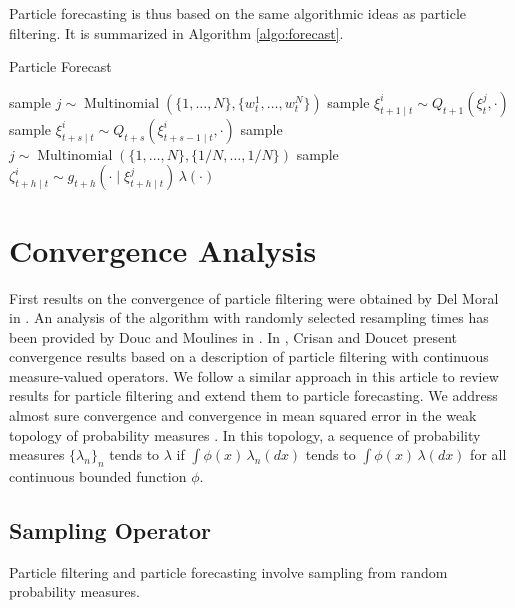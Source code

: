 \documentclass{article}
\begin{document}
Particle forecasting is thus based on the same algorithmic ideas as particle filtering. It is summarized in Algorithm \ref{algo:forecast}.

\begin{algorithm}
\caption{Particle Forecast}
\label{algo:forecast}
\begin{algorithmic}
      \State sample $j \sim \operatorname{Multinomial}(\{1,\dots,N\}, \{w^1_t,\dots,w^N_t\})$
      \State sample $\xi^i_{t+1 \mid t} \sim Q_{t+1}(\xi^j_t,\cdot)$
      \State sample $\xi^i_{t+s \mid t} \sim Q_{t+s}(\xi^i_{t+s-1 \mid t},\cdot)$
    \EndFor
  \EndFor
    \State sample $j \sim \operatorname{Multinomial}(\{1,\dots,N\}, \{1/N,\dots,1/N\})$
    \State sample $\zeta^i_{t+h \mid t} \sim g_{t+h}(\cdot \mid \xi^j_{t+h \mid t}) \, \lambda(\cdot)$
  \EndFor
\end{algorithmic}
\end{algorithm}

\section{Convergence Analysis}
\label{sec:convergence}

First results on the convergence of particle filtering were obtained by Del Moral in \cite{DelMoral1996,DelMoral1998}. An analysis of the algorithm with randomly selected resampling times has been provided by Douc and Moulines in \cite{Douc2008}. In \cite{Crisan2002}, Crisan and Doucet present convergence results based on a description of particle filtering with continuous measure-valued operators. We follow a similar approach in this article to review results for particle filtering and extend them to particle forecasting. We address almost sure convergence and convergence in mean squared error in the weak topology of probability measures \cite[Chapter 2]{Huber1981}. In this topology, a sequence of probability measures $\{\lambda_n\}_n$ tends to $\lambda$ if $\displaystyle \int \phi(x) \, \lambda_n(dx)$ tends to $\displaystyle \int \phi(x) \, \lambda(dx)$ for all continuous bounded function $\phi$.

\subsection{Sampling Operator}

Particle filtering and particle forecasting involve sampling from random probability measures.
\end{document}
